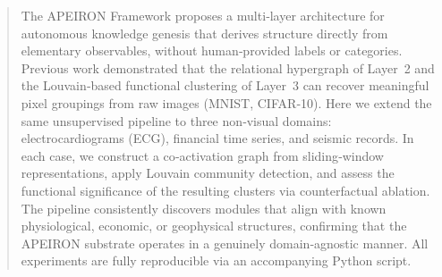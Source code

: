 \begin{abstract}
The APEIRON Framework proposes a multi‑layer architecture for autonomous knowledge genesis that derives structure directly from elementary observables, without human‑provided labels or categories.
Previous work demonstrated that the relational hypergraph of Layer~2 and the Louvain‑based functional clustering of Layer~3 can recover meaningful pixel groupings from raw images (MNIST, CIFAR‑10).
Here we extend the same unsupervised pipeline to three non‑visual domains: electrocardiograms (ECG), financial time series, and seismic records.
In each case, we construct a co‑activation graph from sliding‑window representations, apply Louvain community detection, and assess the functional significance of the resulting clusters via counterfactual ablation.
The pipeline consistently discovers modules that align with known physiological, economic, or geophysical structures, confirming that the APEIRON substrate operates in a genuinely domain‑agnostic manner.
All experiments are fully reproducible via an accompanying Python script.
\end{abstract}